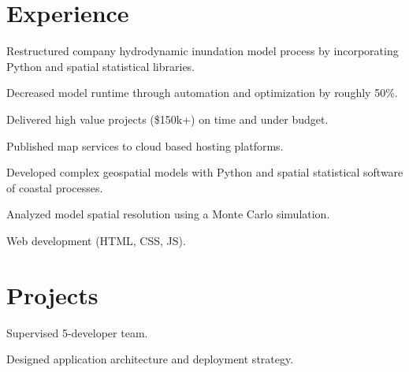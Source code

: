 \documentclass[]{sanchagrins-resume}
\begin{document}
\begin{minipage}[t]{0.63\textwidth} 


\section{Experience}
\vspace{\topsep}
\begin{tightemize}
\item Restructured company hydrodynamic inundation model process by incorporating Python and spatial statistical libraries.
\item Decreased model runtime through automation and optimization by roughly 50\%.
\item Delivered high value projects (\$150k+) on time and under budget.
\item Published map services to cloud based hosting platforms.
\end{tightemize}

\sectionsep
{}
\begin{tightemize}
\item Developed complex geospatial models with Python and spatial statistical software of coastal processes.
\item Analyzed model spatial resolution using a Monte Carlo simulation.
\item Web development (HTML, CSS, JS).
\end{tightemize}
\sectionsep


\section{Projects}

\begin{tightemize}
\item Supervised 5-developer team.
\item Designed application architecture and deployment strategy.
\end{tightemize}
\sectionsep


\end{minipage}
\end{document}
